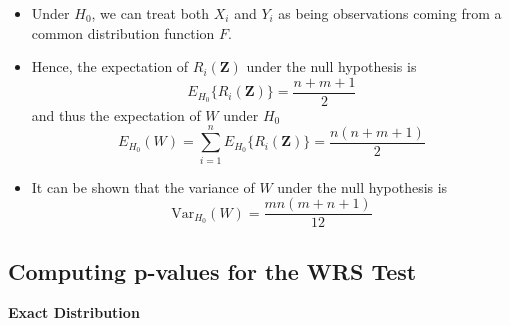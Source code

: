 \documentclass[]{book}
\begin{document}
\begin{itemize}
\item
  Under \(H_{0}\), we can treat both \(X_{i}\) and \(Y_{i}\) as being observations coming from
  a common distribution function \(F\).
\item
  Hence, the expectation of \(R_{i}(\mathbf{Z})\) under the null hypothesis is
  \begin{equation}
  E_{H_{0}}\{ R_{i}(\mathbf{Z}) \} = \frac{n + m + 1}{2}
  \end{equation}
  and thus the expectation of \(W\) under \(H_{0}\)
  \begin{equation}
  E_{H_{0}}( W ) = \sum_{i=1}^{n} E_{H_{0}}\{ R_{i}( \mathbf{Z} ) \}
  = \frac{ n(n + m + 1)  }{ 2 }
  \end{equation}
\item
  It can be shown that the variance of \(W\) under the null hypothesis is
  \begin{equation}
  \textrm{Var}_{H_{0}}( W ) = \frac{mn(m + n + 1)}{12}
  \end{equation}
\end{itemize}

\hypertarget{computing-p-values-for-the-wrs-test}{%
\subsection{Computing p-values for the WRS Test}\label{computing-p-values-for-the-wrs-test}}

\textbf{Exact Distribution}
\end{document}
